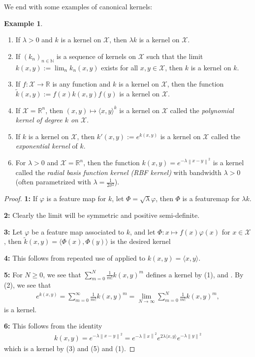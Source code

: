 \documentclass[10pt,twoside,openany,final]{memoir}
\theoremstyle{definition}
\theoremstyle{Break}
\newtheorem{example}[theorem]{Example}
\newcommand{\lv}{\left\lVert}
\newcommand{\rv}{\right\rVert}
\newcommand{\R}{\mathbb{R}}
\newcommand{\N}{\mathbb{N}}
\begin{document}
We end with some examples of canonical kernels:
\begin{example}\mbox{\\}
	\begin{enumerate}
		\item If $\lambda>0$ and $k$ is a kernel on $\mathcal{X}$, then $\lambda k$ is a kernel on $\mathcal{X}$.
		\item If $(k_n)_{n \in \N}$ is a sequence of kernels on $\mathcal{X}$ such that the limit $k(x,y):=\lim_{n} k_n(x,y)$ exists for all $x,y \in \mathcal{X}$, then $k$ is a kernel on $k$.
		\item If $f \colon \mathcal{X} \to \R$ is any function and $k$ is a kernel on $\mathcal{X}$, then the function $\tilde{k}(x,y) := f(x) k(x,y) f(y)$ is a kernel on $\mathcal{X}$.
		\item If $\mathcal{X} = \R^n$, then $(x,y) \mapsto \langle x,y \rangle ^k$ is a kernel on $\mathcal{X}$ called the \emph{polynomial kernel of degree $k$ on $\mathcal{X}$}.
		\item If $k$ is a kernel on $\mathcal{X}$, then $k'(x,y) := e^{k(x,y)}$ is a kernel on $\mathcal{X}$ called the \emph{exponential kernel} of $k$.
		\item For $\lambda > 0$ and $\mathcal{X} = \R^n$, then the function $k(x,y) = e^{-\lambda \lv x-y \rv^2}$ is a kernel called the \emph{radial basis function kernel (RBF kernel)} with bandwidth $\lambda > 0$ (often parametrized with $\lambda = \frac{1}{2 \sigma^2}$).
	\end{enumerate}
\end{example}
\begin{proof}
	\textbf{1:} If $\varphi$ is a feature map for $k$, let $\Phi = \sqrt{\lambda} \varphi$, then $\Phi$ is a featuremap for $\lambda k$.

	\textbf{2:} Clearly the limit will be symmetric and positive semi-definite.

	\textbf{3:} Let $\varphi$ be a feature map associated to $k$, and let $\Phi \colon x \mapsto f(x)\varphi(x)$ for $x \in \mathcal{X}$, then $\tilde{k}(x,y) = \langle \Phi(x), \Phi(y)\rangle$ is the desired kernel

	\textbf{4:} This follows from repeated use of  applied to $k(x,y) = \langle x, y \rangle$.

	\textbf{5:} For $N \geq 0$, we see that $\sum_{m=0}^N \frac{1}{m!}k(x,y)^m$ defines a kernel by (1),  and . By (2), we see that 
	\begin{align*}	
		e^{k(x,y)}=\sum_{m=0}^\infty \frac{1}{m!}k(x,y)^m = \lim_{N \to \infty} \sum_{m=0}^N \frac{1}{m!}k(x,y)^m,
	\end{align*}
	is a kernel.

	\textbf{6:} This follows from the identity
	\begin{align*}
		k(x,y) = e^{-\lambda \lv x-y \rv^2} = e^{-\lambda \lv x \rv^2} e^{2 \lambda \langle x,y \rangle} e^{- \lambda \lv y \rv^2}
	\end{align*}
	which is a kernel by (3) and (5) and (1).
\end{proof}
\end{document}

